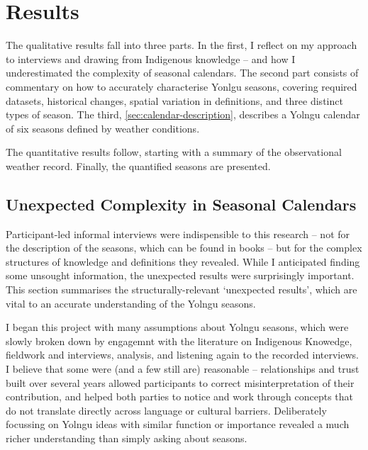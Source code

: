 \chapter{Results}
\label{ch:results}

The qualitative results fall into three parts.  In the first,
I reflect on my approach to interviews and drawing from Indigenous knowledge --
and how I underestimated the complexity of seasonal calendars.
The second part consists of commentary on how to accurately characterise
Yonlgu seasons, covering required datasets, historical changes, spatial
variation in definitions, and three distinct types of season.
The third, \cref{sec:calendar-description}, describes a Yolngu calendar
of six seasons defined by weather conditions.

The quantitative results follow, starting with a summary of the
observational weather record.  Finally, the quantified seasons are
presented.



\section{Unexpected Complexity in Seasonal Calendars}
\label{sec:complex-seasons}

Participant-led informal interviews were indispensible to this research --
not for the description of the seasons, which can be found in books
\citep[eg.][]{davis1989,atlas2014} -- but for the complex structures
of knowledge and definitions they revealed.  While I anticipated finding
some unsought information, the unexpected results were surprisingly important.
This section summarises the structurally-relevant `unexpected results',
which are vital to an accurate understanding of the Yolngu seasons.

I began this project with many assumptions about Yolngu seasons, which were
slowly broken down by engagemnt with the literature on Indigenous Knowedge,
fieldwork and interviews, analysis, and listening again to the recorded
interviews.
%
I believe that some were (and a few still are) reasonable -- relationships
and trust built over several years allowed participants to correct
misinterpretation of their contribution, and helped both parties to notice
and work through concepts that do not translate directly across language or
cultural barriers.  Deliberately focussing on Yolngu ideas with similar
function or importance revealed a much richer understanding than
simply asking about seasons.

